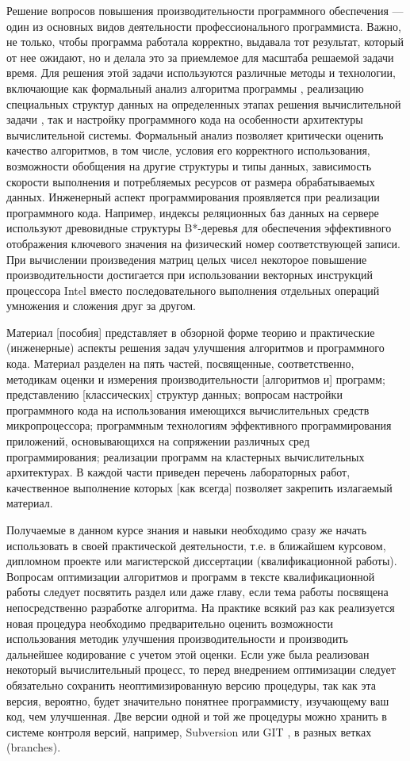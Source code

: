 \documentclass[14pt, openany, twoside, draft]{extbook} %
\newcommand{\e}[2][fcolor]{\textcolor{pcolor}{[}\textcolor{#1}{#2}\textcolor{pcolor}{]}}
\begin{document}
Решение вопросов повышения производительности программного обеспечения
--- один из основных видов деятельности профессионального
программиста.  Важно, не только, чтобы программа работала корректно,
выдавала тот результат, который от нее ожидают, но и делала это за
приемлемое для масштаба решаемой задачи время.  Для решения этой
задачи используются различные методы и технологии, включающие как
формальный анализ алгоритма программы \cite{progproof}, реализацию
специальных структур данных на определенных этапах решения
вычислительной задачи \cite{algstruct}, так и настройку программного
кода на особенности архитектуры вычислительной системы.  Формальный
анализ позволяет критически оценить качество алгоритмов, в том числе,
условия его корректного использования, возможности обобщения на другие
структуры и типы данных, зависимость скорости выполнения и
потребляемых ресурсов от размера обрабатываемых данных.  Инженерный
аспект программирования проявляется при реализации программного кода.
Например, индексы реляционных баз данных на сервере используют
древовидные структуры B*-деревья для обеспечения эффективного
отображения ключевого значения на физический номер соответствующей
записи.  При вычислении произведения матриц целых чисел некоторое
повышение производительности достигается при использовании векторных
инструкций процессора Intel вместо последовательного выполнения
отдельных операций умножения и сложения друг за другом.

Материал \e{пособия} представляет в обзорной форме теорию и
практические (инженерные) аспекты решения задач улучшения алгоритмов и
программного кода.  Материал разделен на пять частей, посвященные,
соответственно, методикам оценки и измерения производительности
\e{алгоритмов и} программ; представлению \e{классических} структур
данных; вопросам настройки программного кода на использования
имеющихся вычислительных средств микропроцессора; программным
технологиям эффективного программирования приложений, основывающихся
на сопряжении различных сред программирования; реализации программ на
кластерных вычислительных архитектурах.  В каждой части приведен
перечень лабораторных работ, качественное выполнение которых \e{как
  всегда} позволяет закрепить излагаемый материал.

Получаемые в данном курсе знания и навыки необходимо сразу же начать
использовать в своей практической деятельности, т.е. в ближайшем
курсовом, дипломном проекте или магистерской диссертации
(квалификационной работы).  Вопросам оптимизации алгоритмов и программ
в тексте квалификационной работы следует посвятить раздел или даже
главу, если тема работы посвящена непосредственно разработке
алгоритма.  На практике всякий раз как реализуется новая процедура
необходимо предварительно оценить возможности использования методик
улучшения производительности и производить дальнейшее кодирование с
учетом этой оценки.  Если уже была реализован некоторый вычислительный
процесс, то перед внедрением оптимизации следует обязательно сохранить
неоптимизированную версию процедуры, так как эта версия, вероятно,
будет значительно понятнее программисту, изучающему ваш код, чем
улучшенная.  Две версии одной и той же процедуры можно хранить в
системе контроля версий, например, Subversion \cite{svn} или GIT
\cite{git}, в разных ветках (branches).
\end{document}
